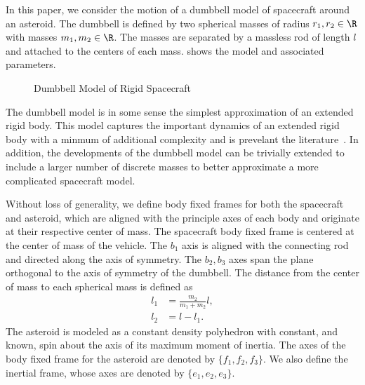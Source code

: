 \documentclass[smallextended]{svjour3}       %
\begin{document}
In this paper, we consider the motion of a dumbbell model of spacecraft around an asteroid.
The dumbbell is defined by two spherical masses of radius \( r_1, r_2 \in \R \) with masses \( m_1, m_2 \in  \R\).
The masses are separated by a massless rod of length \( l \) and attached to the centers of each mass.
 shows the model and associated parameters.
\begin{figure}[htbp]
    \centering
    
    \caption{Dumbbell Model of Rigid Spacecraft\label{fig:dumbbell_sc}}
\end{figure}
The dumbbell model is in some sense the simplest approximation of an extended rigid body.
This model captures the important dynamics of an extended rigid body with a minmum of additional complexity and is prevelant the literature~\cite{kulumani2017b,lee2006a,lee2007a,elmasri2005}.
In addition, the developments of the dumbbell model can be trivially extended to include a larger number of discrete masses to better approximate a more complicated spacecraft model.

Without loss of generality, we define body fixed frames for both the spacecraft and asteroid, which are aligned with the principle axes of each body and originate at their respective center of mass. 
The spacecraft body fixed frame is centered at the center of mass of the vehicle.
The \( b_1 \)  axis is aligned with the connecting rod and directed along the axis of symmetry.
The \( b_2, b_3 \) axes span the plane orthogonal to the axis of symmetry of the dumbbell.
The distance from the center of mass to each spherical mass is defined as
\begin{align}\label{eq:dumbbell_mass_distances}
    l_1 &= \frac{m_2}{m_1 + m_2} l, \\
    l_2 &= l - l_1.
\end{align}
The asteroid is modeled as a constant density polyhedron with constant, and known, spin about the axis of its maximum moment of inertia. 
The axes of the body fixed frame for the asteroid are denoted by $\{f_1,f_2,f_3\}$. 
We also define the inertial frame, whose axes are denoted by $\{e_1,e_2,e_3\}$. 
\end{document}
